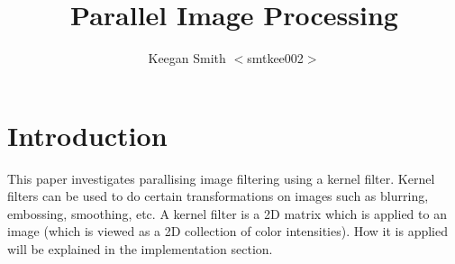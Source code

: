 \documentclass{article}
\title{Parallel Image Processing}
\author{Keegan Smith \small $<$smtkee002$>$}
\begin{document}
\maketitle



\section{Introduction}

This paper investigates parallising image filtering using a kernel
filter. Kernel filters can be used to do certain transformations on images
such as blurring, embossing, smoothing, etc. A kernel filter is a 2D matrix
which is applied to an image (which is viewed as a 2D collection of color
intensities). How it is applied will be explained in the implementation
section.
\end{document}
